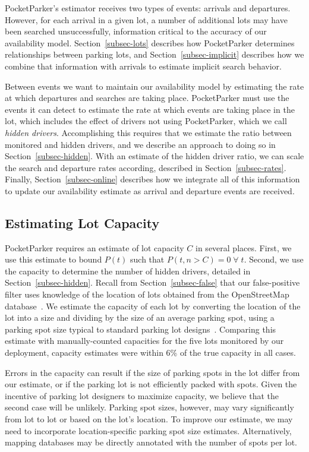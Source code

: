 PocketParker's estimator receives two types of events: arrivals and
departures. However, for each arrival in a given lot, a number of additional
lots may have been searched unsuccessfully, information critical to the
accuracy of our availability model. Section~\ref{subsec-lots} describes how
PocketParker determines relationships between parking lots, and
Section~\ref{subsec-implicit} describes how we combine that information with
arrivals to estimate implicit search behavior.

Between events we want to maintain our availability model by estimating the
rate at which departures and searches are taking place. PocketParker must use
the events it can detect to estimate the rate at which events are taking
place in the lot, which includes the effect of drivers not using
PocketParker, which we call \textit{hidden drivers}. Accomplishing this
requires that we estimate the ratio between monitored and hidden drivers, and
we describe an approach to doing so in Section~\ref{subsec-hidden}. With an
estimate of the hidden driver ratio, we can scale the search and departure
rates according, described in Section~\ref{subsec-rates}. Finally,
Section~\ref{subsec-online} describes how we integrate all of this
information to update our availability estimate as arrival and departure
events are received.

\subsection{Estimating Lot Capacity}
\label{subsec-capacity}

PocketParker requires an estimate of lot capacity $C$ in several places.
First, we use this estimate to bound $P(t)$ such that $P(t, n > C) =
0\;\forall\;t$. Second, we use the capacity to determine the number of hidden
drivers, detailed in Section~\ref{subsec-hidden}. Recall from
Section~\ref{subsec-false} that our false-positive filter uses knowledge of
the location of lots obtained from the OpenStreetMap
database~\cite{openstreetmap}. We estimate the capacity of each lot by
converting the location of the lot into a size and dividing by the size of an
average parking spot, using a parking spot size typical to standard parking
lot designs~\cite{parkingdesign}. Comparing this estimate with
manually-counted capacities for the five lots monitored by our deployment,
capacity estimates were within 6\% of the true capacity in all cases.

Errors in the capacity can result if the size of parking spots in the lot
differ from our estimate, or if the parking lot is not efficiently packed
with spots. Given the incentive of parking lot designers to maximize
capacity, we believe that the second case will be unlikely. Parking spot
sizes, however, may vary significantly from lot to lot or based on the lot's
location. To improve our estimate, we may need to incorporate
location-specific parking spot size estimates. Alternatively, mapping
databases may be directly annotated with the number of spots per lot.

